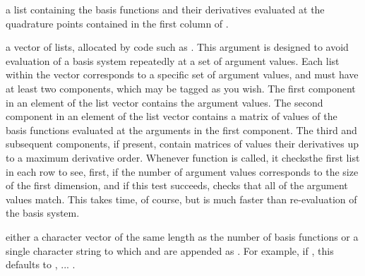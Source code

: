 \begin{Arguments}
\begin{ldescription}
\item[\code{values}] a list containing the basis functions and their derivatives
evaluated at the quadrature points contained in the first
column of .

\item[\code{basisvalues}] a vector of lists, allocated by code such as  .
This argument is designed to avoid evaluation of a basis system repeatedly
at a set of argument values.  Each list within the vector corresponds to a
specific set of argument values, and must have at least two components,
which may be tagged as you wish.  The first component in an element of the
list vector contains the argument values.  The second component in an
element of the list vector contains a matrix of values of the basis
functions evaluated at the arguments in the first component.  The third and
subsequent components, if present, contain matrices of values their
derivatives up to a maximum derivative order. Whenever function
 is called, it checksthe first list in each row to
see, first, if the number of argument values corresponds to the size of the
first dimension, and if this test succeeds, checks that all of the argument
values match.  This takes time, of course, but is much  faster than
re-evaluation of the basis system.

\item[\code{names}] either a character vector of the same length as the number of basis
functions or a single character string to which 
and  are appended as .  For example, if , this
defaults to , ... .

\end{ldescription}
\end{Arguments}
